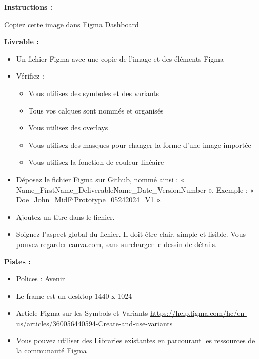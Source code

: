 \makeheaderfiles

\textbf{Instructions :}

Copiez cette image dans Figma
Dashboard

\textbf{Livrable :}

\begin{itemize}
\item Un fichier Figma avec une copie de l'image et des éléments Figma
\item Vérifiez :
\begin{itemize}
\item Vous utilisez des symboles et des variants
\item Tous vos calques sont nommés et organisés
\item Vous utilisez des overlays
\item Vous utilisez des masques pour changer la forme d'une image importée
\item Vous utilisez la fonction de couleur linéaire
\end{itemize}
\item Déposez le fichier Figma sur Github, nommé ainsi : « Name\_FirstName\_DeliverableName\_Date\_VersionNumber ». Exemple : « Doe\_John\_MidFiPrototype\_05242024\_V1 ».
\item Ajoutez un titre dans le fichier.
\item Soignez l'aspect global du fichier. Il doit être clair, simple et lisible. Vous pouvez regarder canva.com, sans surcharger le dessin de détails.
\end{itemize}

\textbf{Pistes :}

\begin{itemize}
\item Polices : Avenir
\item Le frame est un desktop 1440 x 1024
\item Article Figma sur les Symbols et Variants \url{https://help.figma.com/hc/en-us/articles/360056440594-Create-and-use-variants}
\item Vous pouvez utiliser des Libraries existantes en parcourant les ressources de la communauté Figma
\end{itemize}

